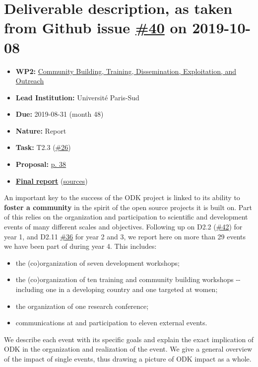 \hypertarget{deliverable-description-as-taken-from-github-issue-40-on-2019-10-08}{%
\section*{\texorpdfstring{Deliverable description, as taken from Github
issue
\href{https://github.com/OpenDreamKit/OpenDreamKit/issues/40}{\#40} on
2019-10-08}{Deliverable description, as taken from Github issue \#40 on 2019-10-08}}\label{deliverable-description-as-taken-from-github-issue-40-on-2019-10-08}}

\begin{itemize}
\tightlist
\item
  \textbf{WP2:}
  \href{https://github.com/OpenDreamKit/OpenDreamKit/tree/master/WP2}{Community
  Building, Training, Dissemination, Exploitation, and Outreach}
\item
  \textbf{Lead Institution:} Université Paris-Sud
\item
  \textbf{Due:} 2019-08-31 (month 48)
\item
  \textbf{Nature:} Report
\item
  \textbf{Task:} T2.3
  (\href{https://github.com/OpenDreamKit/OpenDreamKit/issues/26}{\#26})
\item
  \textbf{Proposal:}
  \href{https://github.com/OpenDreamKit/OpenDreamKit/raw/master/Proposal/proposal-www.pdf}{p.
  38}
\item
  \textbf{\href{https://github.com/OpenDreamKit/OpenDreamKit/raw/master/WP2/D2.15/report-final.pdf}{Final
  report}}
  (\href{https://github.com/OpenDreamKit/OpenDreamKit/raw/master/WP2/D2.15/}{sources})
\end{itemize}

An important key to the success of the ODK project is linked to its
ability to \textbf{foster a community} in the spirit of the open source
projects it is built on. Part of this relies on the organization and
participation to scientific and development events of many different
scales and objectives. Following up on D2.2
(\href{https://github.com/OpenDreamKit/OpenDreamKit/issues/42}{\#42})
for year 1, and D2.11
\href{https://github.com/OpenDreamKit/OpenDreamKit/issues/36}{\#36} for
year 2 and 3, we report here on more than 29 events we have been part of
during year 4. This includes:

\begin{itemize}
\tightlist
\item
  the (co)organization of seven development workshops;
\item
  the (co)organization of ten training and community building workshops
  -\/- including one in a developing country and one targeted at women;
\item
  the organization of one research conference;
\item
  communications at and participation to eleven external events.
\end{itemize}

We describe each event with its specific goals and explain the exact
implication of ODK in the organization and realization of the event. We
give a general overview of the impact of single events, thus drawing a
picture of ODK impact as a whole.
